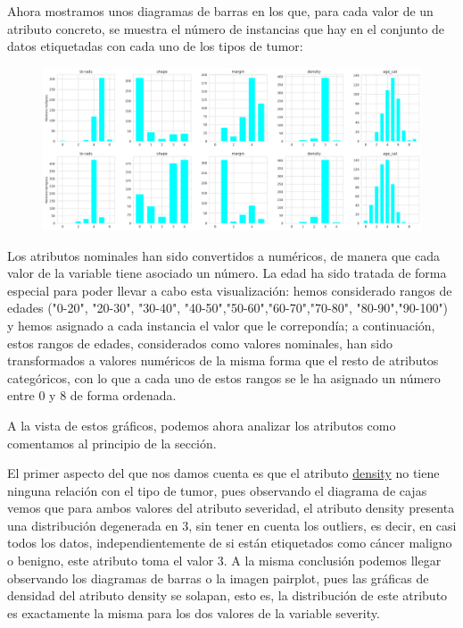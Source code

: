 \documentclass[a4paper,11pt]{book}
\begin{document}
Ahora mostramos unos diagramas de barras en los que, para cada valor de un atributo concreto, se muestra el número de instancias que hay en el conjunto de datos etiquetadas con cada uno de los tipos de tumor:
\begin{figure}[H]
	\centering
	\includegraphics[width=1.1\linewidth]{img/analisis}
	\caption{}
	\label{fig:analisis}
\end{figure}
Los atributos nominales han sido convertidos a numéricos, de manera que cada valor de la variable tiene asociado un número. La edad ha sido tratada de forma especial para poder llevar a cabo esta visualización: hemos considerado rangos de edades ("0-20", "20-30", "30-40", "40-50","50-60","60-70","70-80", "80-90","90-100") y hemos asignado a cada instancia el valor que le correpondía; a continuación, estos rangos de edades, considerados como valores nominales, han sido transformados a valores numéricos de la misma forma que el resto de atributos categóricos, con lo que a cada uno de estos rangos se le ha asignado un número entre 0 y 8 de forma ordenada.

A la vista de estos gráficos, podemos ahora analizar los atributos como comentamos al principio de la sección. 

El primer aspecto del que nos damos cuenta es que el atributo \underline{density} no tiene ninguna relación con el tipo de tumor, pues observando el diagrama de cajas vemos que para ambos valores del atributo severidad, el atributo density presenta una distribución degenerada en 3, sin tener en cuenta los outliers, es decir, en casi todos los datos, independientemente de si están etiquetados como cáncer maligno o benigno, este atributo toma el valor 3. A la misma conclusión podemos llegar observando los diagramas de barras o la imagen pairplot, pues las gráficas de densidad del atributo density se solapan, esto es, la distribución de este atributo es exactamente la misma para los dos valores de la variable severity. 
\end{document}
